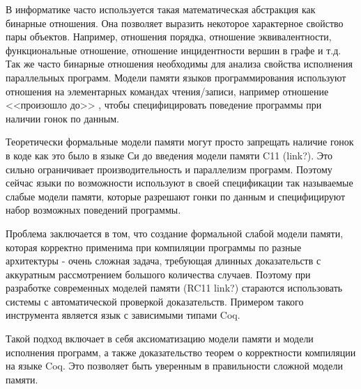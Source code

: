 \documentclass[times
              ]{itmo-student-thesis}
\begin{document}

\tableofcontents

\startprefacepage



 В информатике часто используется такая математическая абстракция как бинарные отношения.
Она позволяет выразить некоторое характерное свойство пары объектов. Например, отношения порядка, отношение эквивалентности, функциональные отношение, отношение инцидентности вершин в графе и т.д.
Так же часто бинарные отношения необходимы для анализа свойства исполнения параллельных программ. Модели памяти языков программирования используют отношения на элементарных командах чтения/записи, например отношение <<произошло до>> , чтобы специфицировать поведение программы при наличии гонок по данным.

Теоретически формальные модели памяти могут просто запрещать наличие гонок в коде как это было в языке Си до введения модели памяти C11 (link?). Это сильно ограничивает производительность и параллелизм программ. Поэтому сейчас языки по возможности используют в своей спецификации так называемые слабые модели памяти, которые разрешают гонки по данным и специфицируют набор возможных поведений программы.

Проблема заключается в том, что создание формальной слабой модели памяти, которая корректно применима при компиляции программы по разные архитектуры - очень сложная задача, требующая длинных доказательств с аккуратным рассмотрением большого количества случаев.
Поэтому при разработке современных моделей памяти (RC11 link?) стараются использовать системы с автоматической проверкой доказательств. Примером такого инструмента является язык с зависимыми типами Coq.

Такой подход включает в себя аксиоматизацию модели памяти и модели исполнения программ, а
также доказательство теорем о корректности компиляции на языке Coq. Это позволяет быть уверенным в правильности сложной модели памяти.
\end{document}
